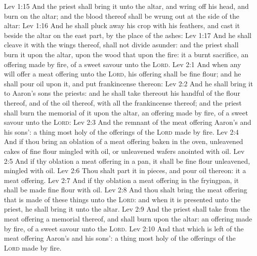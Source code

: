 \vs Lev 1:15 And the priest shall bring it unto the altar, and wring off his head, and burn  on the altar; and the blood thereof shall be wrung out at the side of the altar:
\vs Lev 1:16 And he shall pluck away his crop with his feathers, and cast it beside the altar on the east part, by the place of the ashes:
\vs Lev 1:17 And he shall cleave it with the wings thereof,  shall not divide  asunder: and the priest shall burn it upon the altar, upon the wood that  upon the fire: it  a burnt sacrifice, an offering made by fire, of a sweet savour unto the \textsc{Lord}.
\vs Lev 2:1 And when any will offer a meat offering unto the \textsc{Lord}, his offering shall be  fine flour; and he shall pour oil upon it, and put frankincense thereon:
\vs Lev 2:2 And he shall bring it to Aaron's sons the priests: and he shall take thereout his handful of the flour thereof, and of the oil thereof, with all the frankincense thereof; and the priest shall burn the memorial of it upon the altar,  an offering made by fire, of a sweet savour unto the \textsc{Lord}:
\vs Lev 2:3 And the remnant of the meat offering  Aaron's and his sons':  a thing most holy of the offerings of the \textsc{Lord} made by fire.
\vs Lev 2:4 And if thou bring an oblation of a meat offering baken in the oven,  unleavened cakes of fine flour mingled with oil, or unleavened wafers anointed with oil.
\vs Lev 2:5 And if thy oblation  a meat offering  in a pan, it shall be  fine flour unleavened, mingled with oil.
\vs Lev 2:6 Thou shalt part it in pieces, and pour oil thereon: it  a meat offering.
\vs Lev 2:7 And if thy oblation  a meat offering  in the fryingpan, it shall be made  fine flour with oil.
\vs Lev 2:8 And thou shalt bring the meat offering that is made of these things unto the \textsc{Lord}: and when it is presented unto the priest, he shall bring it unto the altar.
\vs Lev 2:9 And the priest shall take from the meat offering a memorial thereof, and shall burn  upon the altar:  an offering made by fire, of a sweet savour unto the \textsc{Lord}.
\vs Lev 2:10 And that which is left of the meat offering  Aaron's and his sons':  a thing most holy of the offerings of the \textsc{Lord} made by fire.
